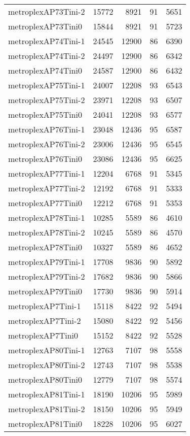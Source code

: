 \begin{longtable}{lrrrr}
metroplexAP73Tini-2 & 15772 & 8921 & 91 & 5651 \\
metroplexAP73Tini0 & 15844 & 8921 & 91 & 5723 \\
metroplexAP74Tini-1 & 24545 & 12900 & 86 & 6390 \\
metroplexAP74Tini-2 & 24497 & 12900 & 86 & 6342 \\
metroplexAP74Tini0 & 24587 & 12900 & 86 & 6432 \\
metroplexAP75Tini-1 & 24007 & 12208 & 93 & 6543 \\
metroplexAP75Tini-2 & 23971 & 12208 & 93 & 6507 \\
metroplexAP75Tini0 & 24041 & 12208 & 93 & 6577 \\
metroplexAP76Tini-1 & 23048 & 12436 & 95 & 6587 \\
metroplexAP76Tini-2 & 23006 & 12436 & 95 & 6545 \\
metroplexAP76Tini0 & 23086 & 12436 & 95 & 6625 \\
metroplexAP77Tini-1 & 12204 & 6768 & 91 & 5345 \\
metroplexAP77Tini-2 & 12192 & 6768 & 91 & 5333 \\
metroplexAP77Tini0 & 12212 & 6768 & 91 & 5353 \\
metroplexAP78Tini-1 & 10285 & 5589 & 86 & 4610 \\
metroplexAP78Tini-2 & 10245 & 5589 & 86 & 4570 \\
metroplexAP78Tini0 & 10327 & 5589 & 86 & 4652 \\
metroplexAP79Tini-1 & 17708 & 9836 & 90 & 5892 \\
metroplexAP79Tini-2 & 17682 & 9836 & 90 & 5866 \\
metroplexAP79Tini0 & 17730 & 9836 & 90 & 5914 \\
metroplexAP7Tini-1 & 15118 & 8422 & 92 & 5494 \\
metroplexAP7Tini-2 & 15080 & 8422 & 92 & 5456 \\
metroplexAP7Tini0 & 15152 & 8422 & 92 & 5528 \\
metroplexAP80Tini-1 & 12763 & 7107 & 98 & 5558 \\
metroplexAP80Tini-2 & 12743 & 7107 & 98 & 5538 \\
metroplexAP80Tini0 & 12779 & 7107 & 98 & 5574 \\
metroplexAP81Tini-1 & 18190 & 10206 & 95 & 5989 \\
metroplexAP81Tini-2 & 18150 & 10206 & 95 & 5949 \\
metroplexAP81Tini0 & 18228 & 10206 & 95 & 6027 \\

\end{longtable}
